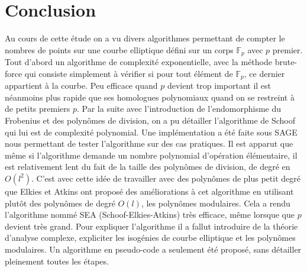\documentclass[12pt]{article}
\begin{document}
\section{Conclusion}
Au cours de cette étude on a vu divers algorithmes permettant de compter le nombres de points sur une courbe elliptique défini sur un corps $\mathbb{F}_p$ avec $p$ premier. Tout d'abord un algorithme de complexité exponentielle, avec la méthode brute-force qui consiste simplement à vérifier si pour tout élément de $\mathbb{F}_p$, ce dernier appartient à la courbe. Peu efficace quand $p$ devient trop important il est néanmoins plus rapide que ses homologues polynomiaux quand on se restreint à de petits premiers $p$. Par la suite avec l'introduction de l'endomorphisme du Frobenius et des polynômes de division, on a pu détailler l'algorithme de Schoof qui lui est de complexité polynomial. Une implémentation a été faite sous SAGE nous permettant de tester l'algorithme sur des cas pratiques. Il est apparut que même si l'algorithme demande un nombre polynomial d'opération élémentaire, il est relativement lent du fait de la taille des polynômes de division, de degré en $O(l^2)$. C'est avec cette idée de travailler avec des polynômes de plus petit degré que Elkies et Atkins ont proposé des améliorations à cet algorithme en utilisant plutôt des polynômes de degré $O(l)$, les polynômes modulaires. Cela a rendu l’algorithme nommé SEA (Schoof-Elkies-Atkins) très efficace, même lorsque que $p$ devient très grand. Pour expliquer l'algorithme il a fallut introduire de la théorie d'analyse complexe, expliciter les isogénies de courbe elliptique et les polynômes modulaires. Un algorithme en pseudo-code a seulement été proposé, sans détailler pleinement toutes les étapes. 
\newpage


\end{document}

